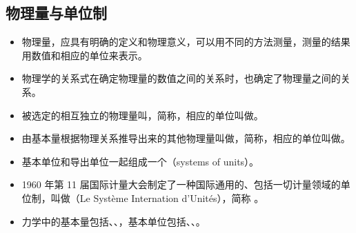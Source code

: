 \subsection{物理量与单位制}
\begin{itemize}
\item 物理量，应具有明确的定义和物理意义，可以用不同的方法测量，测量的结果用数值和相应的单位来表示。
\item 物理学的关系式在确定物理量的数值之间的关系时，也确定了物理量之间的关系。
\item 被选定的相互独立的物理量叫，简称，相应的单位叫做。
\item 由基本量根据物理关系推导出来的其他物理量叫做，简称，相应的单位叫做。
\item 基本单位和导出单位一起组成一个（systems of units）。
\item 1960 年第 11 届国际计量大会制定了一种国际通用的、包括一切计量领域的单位制，叫做（Le Système Internation d'Unités），简称 。
\item 力学中的基本量包括、、，基本单位包括、、。
\end{itemize}